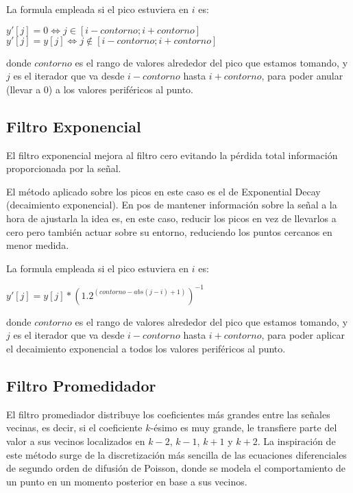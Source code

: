 La formula empleada si el pico estuviera en $i$ es:

\begin{center}
    $y'[j] = 0 \iff j \in [i-contorno; i+contorno]$\\
    $y'[j] = y[j] \iff j \not \in [i-contorno; i+contorno]$\\
\end{center}

donde $contorno$ es el rango de valores alrededor del pico que estamos tomando, y
$j$ es el iterador que va desde $i-contorno$ hasta $i+contorno$, para poder anular
(llevar a 0) a los valores perif\'ericos al punto.

\subsection{Filtro Exponencial}


El filtro exponencial mejora al filtro cero evitando la p\'erdida total
informaci\'on proporcionada por la se\~nal.

El m\'etodo aplicado sobre los picos en este caso es el de Exponential Decay
(decaimiento exponencial). En pos de mantener informaci\'on sobre la se\~nal a
la hora de ajustarla la idea es, en este caso, reducir los picos en vez de
llevarlos a cero pero tambi\'en actuar sobre su entorno, reduciendo los puntos
cercanos en menor medida.

La formula empleada si el pico estuviera en $i$ es:
\begin{center}
$y'[j] = y[j]* (1.2^{(contorno-abs(j-i)+1)})^{-1}$\\
\end{center}
donde $contorno$ es el rango de valores alrededor del pico que estamos tomando, y
$j$ es el iterador que va desde $i-contorno$ hasta $i+contorno$, para poder aplicar
el decaimiento exponencial a todos los valores perif\'ericos al punto.

\subsection{Filtro Promedidador}

El filtro promediador distribuye los coeficientes m\'as grandes 
entre las se\~nales vecinas, es decir, si el coeficiente $k$-\'esimo es muy 
grande, le transfiere parte del valor a sus vecinos localizados en $k-2$, $k-1$, $k+1$ y
$k+2$. La inspiraci\'on de este m\'etodo surge de la discretizaci\'on m\'as sencilla
de las ecuaciones diferenciales de segundo orden de difusi\'on de Poisson, donde
se modela el comportamiento de un punto en un momento posterior en base a sus vecinos.\\


